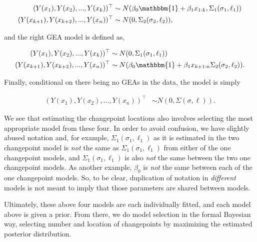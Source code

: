 \documentclass[12pt]{article}
\begin{document}
\begin{align}
(Y(x_1), Y(x_2), ..., Y(x_{k}))^{\top} &\sim N(\beta_{0}\mathbbm{1} + \beta_{1} x_{1:k}, \Sigma_1(\sigma_1, \ell_1)) \\
(Y(x_{k + 1}), Y(x_{k + 2}), ..., Y(x_{n}))^{\top} &\sim N(0, \Sigma_2(\sigma_2, \ell_2)),
\end{align}

\noindent and the right GEA model is defined as,

\begin{align}
(Y(x_{1}), Y(x_{2}), ..., Y(x_{k}))^{\top} &\sim N(0, \Sigma_1(\sigma_1, \ell_1)) \\ 
(Y(x_{k + 1}), Y(x_{k + 2}), ..., Y(x_n))^{\top} &\sim N(\beta_{0}\mathbbm{1} + \beta_{1} x_{k + 1:n} \Sigma_2(\sigma_2, \ell_2)).
\end{align}

\noindent Finally, conditional on there being no GEAs in the data, the
model is simply

\begin{align}
(Y(x_{1}), Y(x_{2}), ..., Y(x_{n}))^{\top} &\sim N(0, \Sigma(\sigma, \ell)).
\end{align}

We see that estimating the changepoint locations also involves selecting
the most appropriate model from these four. In order to avoid confusion,
we have slightly abused notation and, for example,
\(\Sigma_1(\sigma_1, \ell_1)\) as it is estimated in the two changepoint
model is \emph{not} the same as \(\Sigma_1(\sigma_1, \ell_1)\) from
either of the one changepoint models, and \(\Sigma_1(\sigma_1, \ell_1)\)
is also \emph{not} the same between the two one changepoint models. As
another example, \(\beta_0\) is \emph{not} the same between each of the
one changepoint models. So, to be clear, duplication of notation in
\emph{different} models is not meant to imply that those parameters are
shared between models.

Ultimately, these above four models are each individually fitted, and
each model above is given a prior. From there, we do model selection in
the formal Bayesian way, selecting number and location of changepoints
by maximizing the estimated posterior distribution.
\end{document}
